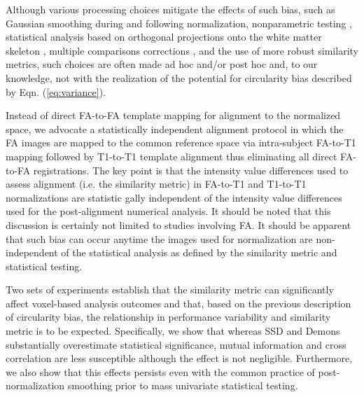 \documentclass[final,5p,times,twocolumn]{elsarticle}
\begin{document}
Although various processing choices mitigate the effects of such bias,
such as Gaussian smoothing during and following normalization, 
nonparametric testing \citep{Rorden2007}, 
statistical analysis based on orthogonal projections onto the white matter skeleton 
\cite{Smith2006}, multiple comparisons corrections \cite{Nichols2003}, and the use of more robust similarity metrics, 
such choices are often made ad hoc and/or post hoc and, to our 
knowledge, not with the realization of the potential
for circularity bias described by Eqn. (\ref{eq:variance}).  

Instead of direct FA-to-FA template mapping for 
alignment to the normalized space, we advocate a statistically 
independent alignment protocol in which the FA images are mapped to 
the common reference space via intra-subject FA-to-T1 mapping 
followed by T1-to-T1 template alignment thus eliminating all direct
FA-to-FA registrations. The key point is that the intensity value differences used 
to assess alignment (i.e. the similarity metric) in FA-to-T1 and T1-to-T1 
normalizations are statistic gally independent of the intensity value differences used for 
the post-alignment numerical analysis.  It should be noted that this discussion
is certainly not limited to studies involving FA.  It should be apparent
that such bias can occur anytime the images used for normalization
are non-independent of the statistical analysis as defined by the similarity
metric and statistical testing. 

Two sets of experiments establish that the similarity metric
can significantly affect voxel-based analysis outcomes and that,
based on the previous description of circularity bias,
the relationship in performance variability and similarity metric
is to be expected.  Specifically, we show that whereas SSD and Demons
substantially overestimate statistical significance, mutual
information and cross correlation are less susceptible although the
effect is not
negligible.  Furthermore, we also show that this effects persists
even with the common practice of post-normalization smoothing prior
to mass univariate statistical testing.
\end{document}
